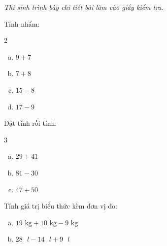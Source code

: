 {\itshape Thí sinh trình bày chi tiết bài làm vào giấy kiểm tra.}

\begin{bt}[1,0 điểm]
Tính nhẩm:
\begin{multicols}{2}
\begin{enumerate}[a)]
  \item $9 + 7$
  \item $7 + 8$
  \item $15 - 8$
  \item $17 - 9$
\end{enumerate}
\end{multicols}
\end{bt}

\begin{bt}[1,5 điểm]
Đặt tính rồi tính:
\begin{multicols}{3}
\begin{enumerate}[a)]
  \item $29 + 41$
  \item $81 - 30$
  \item $47 + 50$
\end{enumerate}
\end{multicols}
\end{bt}

\begin{bt}[1,0 điểm]
Tính giá trị biểu thức kèm đơn vị đo:
\begin{enumerate}[a)]
  \item $19\text{ kg} + 10\text{ kg} - 9\text{ kg}$
  \item $28\text{ }l - 14\text{ }l + 9\text{ }l$
\end{enumerate}
\end{bt}


